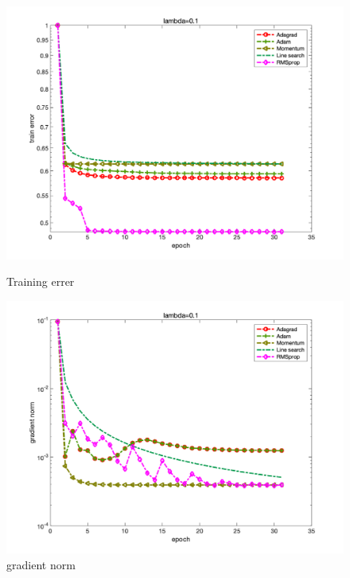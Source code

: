 \documentclass{article}
\begin{document}
\begin{figure}[H]
	\begin{minipage}{0.33\linewidth}
		\centering
		\includegraphics[width=1\linewidth]{./fig/fval_c3}
		\caption{Training errer}
	\end{minipage}
	\begin{minipage}{0.33\linewidth}
		\centering
		\includegraphics[width=1\linewidth]{./fig/gnorm_c3}
		\caption{gradient norm}
	\end{minipage}
	\begin{minipage}{0.33\linewidth}
		\centering

\end{minipage}
\end{figure}
\end{document}
